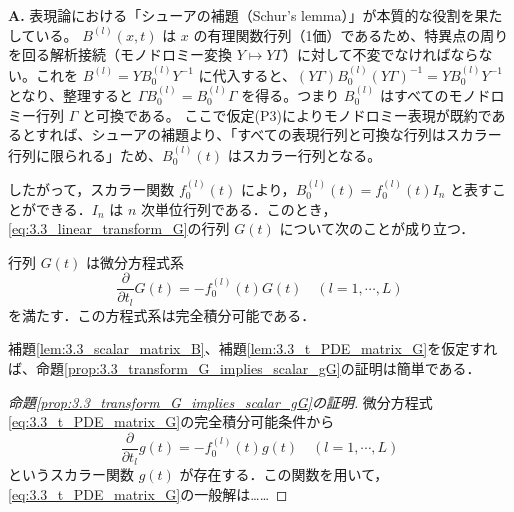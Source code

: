 \begin{Q}
\textbf{A.} 表現論における「シューアの補題（Schur's lemma）」が本質的な役割を果たしている。
$B^{(l)}(x,t)$ は $x$ の有理関数行列（1価）であるため、特異点の周りを回る解析接続（モノドロミー変換 $Y \mapsto Y\Gamma$）に対して不変でなければならない。これを $B^{(l)} = Y B_0^{(l)} Y^{-1}$ に代入すると、$(Y\Gamma) B_0^{(l)} (Y\Gamma)^{-1} = Y B_0^{(l)} Y^{-1}$ となり、整理すると $\Gamma B_0^{(l)} = B_0^{(l)} \Gamma$ を得る。つまり $B_0^{(l)}$ はすべてのモノドロミー行列 $\Gamma$ と可換である。
ここで仮定(P3)によりモノドロミー表現が既約であるとすれば、シューアの補題より、「すべての表現行列と可換な行列はスカラー行列に限られる」ため、$B_0^{(l)}(t)$ はスカラー行列となる。
\end{Q}

したがって，スカラー関数 $f_0^{(l)}(t)$ により，$B_0^{(l)}(t) = f_0^{(l)}(t)I_n$ と表すことができる．$I_n$ は $n$ 次単位行列である．このとき，\eqref{eq:3.3_linear_transform_G}の行列 $G(t)$ について次のことが成り立つ．

\begin{lemma}\label{lem:3.3_t_PDE_matrix_G}
行列 $G(t)$ は微分方程式系
\begin{equation}\label{eq:3.3_t_PDE_matrix_G}
  \frac{\partial}{\partial t_l}G(t) = -f_0^{(l)}(t)G(t) \quad (l=1,\cdots,L)
\end{equation}
を満たす．この方程式系は完全積分可能である．
\end{lemma}

補題\ref{lem:3.3_scalar_matrix_B}、補題\ref{lem:3.3_t_PDE_matrix_G}を仮定すれば、命題\ref{prop:3.3_transform_G_implies_scalar_gG}の証明は簡単である．

\begin{proof}[命題\ref{prop:3.3_transform_G_implies_scalar_gG}の証明]
微分方程式\eqref{eq:3.3_t_PDE_matrix_G}の完全積分可能条件から
\begin{equation}\label{eq:3.3_t-ODE_scalar_g}
  \frac{\partial}{\partial t_l}g(t) = -f_0^{(l)}(t)g(t) \quad (l=1,\cdots,L)
\end{equation}
というスカラー関数 $g(t)$ が存在する．この関数を用いて，\eqref{eq:3.3_t_PDE_matrix_G}の一般解は……

\end{proof}
